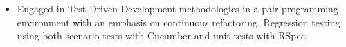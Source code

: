 \documentclass[12pt,letterpaper]{article}
\begin{document}
\begin{itemize}
\begin{itemize}
  \item Engaged in Test Driven Development methodologies in a pair-programming environment
  with an emphasis on continuous refactoring.
  Regression testing using both scenario tests with Cucumber and unit tests with RSpec.

\end{itemize}


%
%
%
%












\end{itemize}
\end{document}
